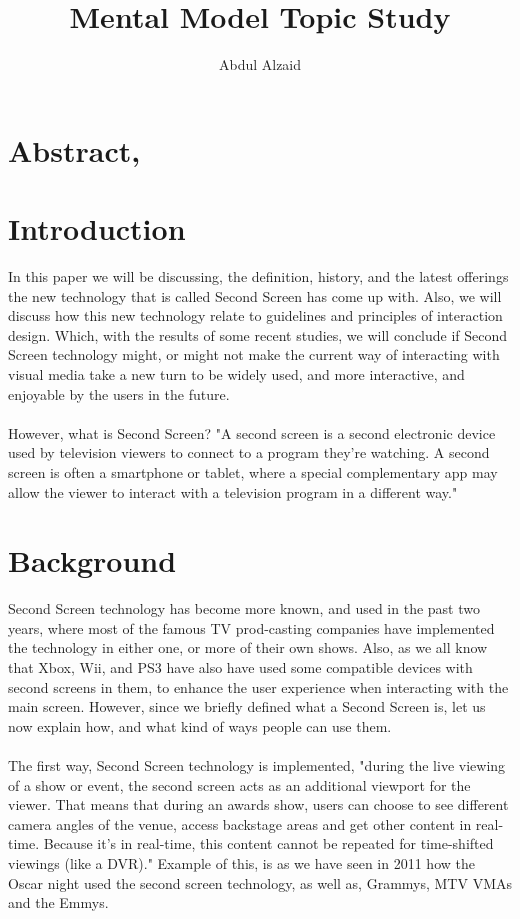 \documentclass[12pt, oneside]{article}   	%
\title{Mental Model Topic Study}
\author{Abdul Alzaid}
\begin{document}
 \maketitle
  \section{Abstract,}
 \section{Introduction}
In this paper we will be discussing, the definition, history, and the latest offerings the new technology that is called Second Screen has come up with. Also, we will discuss how this new technology relate to guidelines and principles of interaction design. Which, with the results of some recent studies, we will conclude if Second Screen technology might, or might not make the current way of interacting with visual media take a new turn to be widely used, and more interactive, and enjoyable by the users in the future. \paragraph{}
However, what is Second Screen?  "A second screen is a second electronic device used by television viewers to connect to a program they're watching. A second screen is often a smartphone or tablet, where a special complementary app may allow the viewer to interact with a television program in a different way."\cite{Second-Screen-Def}
 \section{Background}
 Second Screen technology has become more known, and used in the past two years, where most of the famous TV prod-casting companies have implemented the technology in either one, or more of their own shows.  Also, as we all know that Xbox, Wii, and PS3 have also have used some compatible devices with second screens in them, to enhance the user experience when interacting with the main screen.
 However, since we briefly defined what a Second Screen is, let us now explain how, and what kind of ways people can use them.  
\paragraph{}
The first way, Second Screen technology is implemented, "during the live viewing of a show or event, the second screen acts as an additional viewport for the viewer. That means that during an awards show, users can choose to see different camera angles of the venue, access backstage areas and get other content in real-time. Because it's in real-time, this content cannot be repeated for time-shifted viewings (like a DVR)."\cite{Second-Screen-His} Example of this, is as we have seen in 2011 how the Oscar night used the second screen technology, as well as, Grammys, MTV VMAs and the Emmys.\cite{Second-Screen-His}
\end{document}

